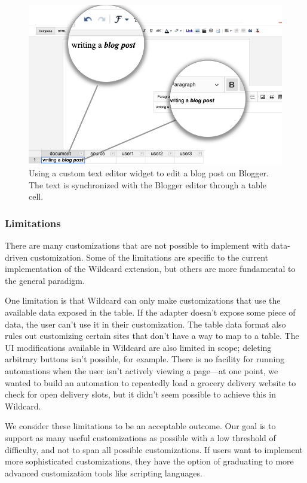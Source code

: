 \documentclass[sigplan,screen,10pt,anonymous,review]{acmart}
\begin{document}
\begin{figure}
\hypertarget{fig:blogger}{%
\centering
\includegraphics[width=\columnwidth]{media/blogger.png}
\caption{Using a custom text editor widget to edit a blog post on Blogger. The text is synchronized with the Blogger editor through a table cell.}\label{fig:blogger}
}
\end{figure}

\hypertarget{limitations}{%
\subsubsection{Limitations}\label{limitations}}

There are many customizations that are not possible to implement with
data-driven customization. Some of the limitations are specific to the
current implementation of the Wildcard extension, but others are more
fundamental to the general paradigm.

One limitation is that Wildcard can only make customizations that use
the available data exposed in the table. If the adapter doesn't expose
some piece of data, the user can't use it in their customization. The
table data format also rules out customizing certain sites that don't
have a way to map to a table. The UI modifications available in Wildcard
are also limited in scope; deleting arbitrary buttons isn't possible,
for example. There is no facility for running automations when the user
isn't actively viewing a page---at one point, we wanted to build an
automation to repeatedly load a grocery delivery website to check for
open delivery slots, but it didn't seem possible to achieve this in
Wildcard.

We consider these limitations to be an acceptable outcome. Our goal is
to support as many useful customizations as possible with a low
threshold of difficulty, and not to span all possible customizations. If
users want to implement more sophisticated customizations, they have the
option of graduating to more advanced customization tools like scripting
languages.
\end{document}
